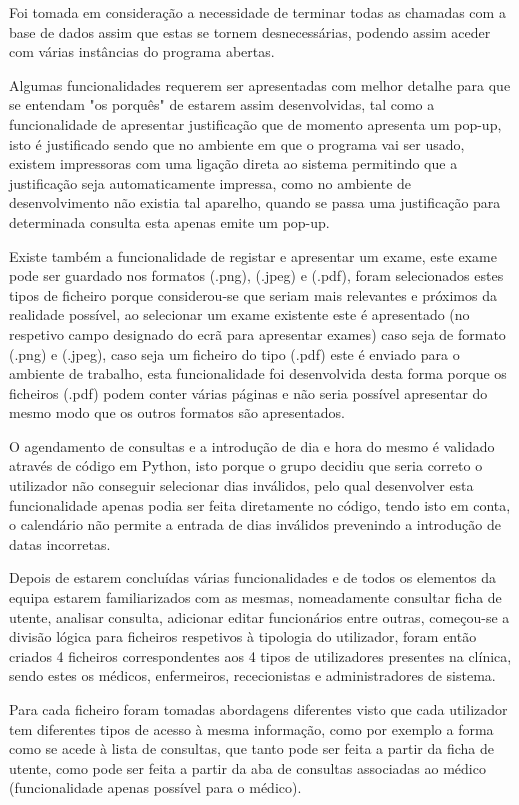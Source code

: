 \documentclass[11pt,a4paper,twoside]{report}
\begin{document}
	Foi tomada em consideração a necessidade de terminar todas as chamadas com a base de dados assim que estas se tornem desnecessárias, podendo assim aceder com várias instâncias do programa abertas.
	
	Algumas funcionalidades requerem ser apresentadas com melhor detalhe para que se entendam "os porquês" de estarem assim desenvolvidas, tal como a funcionalidade de apresentar justificação que de momento apresenta um pop-up, isto é justificado sendo que no ambiente em que o programa vai ser usado, existem impressoras com uma ligação direta ao sistema permitindo que a justificação seja automaticamente impressa, como no ambiente de desenvolvimento não existia tal aparelho, quando se passa uma justificação para determinada consulta esta apenas emite um pop-up. 
	
	Existe também a funcionalidade de registar e apresentar um exame, este exame pode ser guardado nos formatos (.png), (.jpeg) e (.pdf), foram selecionados estes tipos de ficheiro porque considerou-se que seriam mais relevantes e próximos da realidade possível, ao selecionar um exame existente este é apresentado (no respetivo campo designado do ecrã para apresentar exames) caso seja de formato (.png) e (.jpeg), caso seja um ficheiro do tipo (.pdf) este é enviado para o ambiente de trabalho, esta funcionalidade foi desenvolvida desta forma porque os ficheiros (.pdf) podem conter várias páginas e não seria possível apresentar do mesmo modo que os outros formatos são apresentados.
	
	O agendamento de consultas e a introdução de dia e hora do mesmo é validado através de código em Python, isto porque o grupo decidiu que seria correto o utilizador não conseguir selecionar dias inválidos, pelo qual desenvolver esta funcionalidade apenas podia ser feita diretamente no código, tendo isto em conta, o calendário não permite a entrada de dias inválidos prevenindo a introdução de datas incorretas.
	
	Depois de estarem concluídas várias funcionalidades e de todos os elementos da equipa estarem familiarizados com as mesmas, nomeadamente consultar ficha de utente, analisar consulta, adicionar editar funcionários entre outras, começou-se a divisão lógica para ficheiros respetivos à tipologia do utilizador, foram então criados 4 ficheiros correspondentes aos 4 tipos de utilizadores presentes na clínica, sendo estes os médicos, enfermeiros, rececionistas e administradores de sistema.
	
	Para cada ficheiro foram tomadas abordagens diferentes visto que cada utilizador tem diferentes tipos de acesso à mesma informação, como por exemplo a forma como se acede à lista de consultas, que tanto pode ser feita a partir da ficha de utente, como pode ser feita a partir da aba de consultas associadas ao médico (funcionalidade apenas possível para o médico).
	
\end{document}
